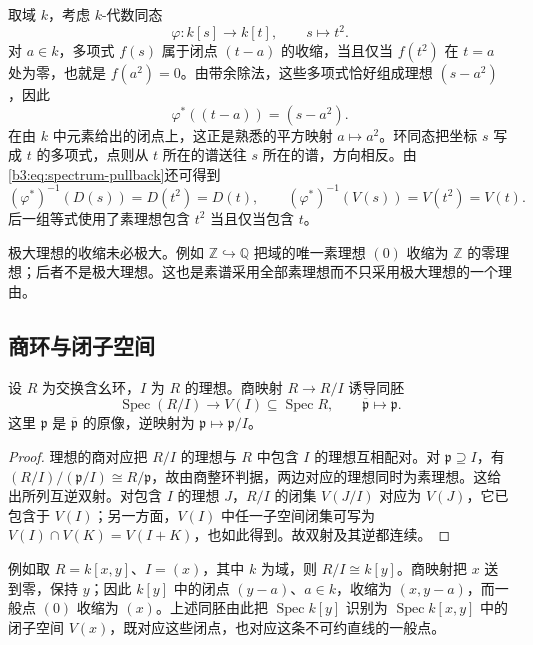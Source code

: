 取域 \(k\)，考虑 \(k\)-代数同态
\[
	\varphi:k[s]\longrightarrow k[t],\qquad s\longmapsto t^2.
\]
对 \(a\in k\)，多项式 \(f(s)\) 属于闭点 \((t-a)\) 的收缩，当且仅当 \(f(t^2)\) 在 \(t=a\) 处为零，也就是 \(f(a^2)=0\)。由带余除法，这些多项式恰好组成理想 \((s-a^2)\)，因此
\[
	\varphi^*((t-a))=(s-a^2).
\]
在由 \(k\) 中元素给出的闭点上，这正是熟悉的平方映射 \(a\mapsto a^2\)。环同态把坐标 \(s\) 写成 \(t\) 的多项式，点则从 \(t\) 所在的谱送往 \(s\) 所在的谱，方向相反。由\eqref{b3:eq:spectrum-pullback}还可得到
\[
	(\varphi^*)^{-1}(D(s))=D(t^2)=D(t),\qquad (\varphi^*)^{-1}(V(s))=V(t^2)=V(t).
\]
后一组等式使用了素理想包含 \(t^2\) 当且仅当包含 \(t\)。

\ProseParagraphBreak
极大理想的收缩未必极大。例如 \(\mathbb Z\hookrightarrow\mathbb Q\) 把域的唯一素理想 \((0)\) 收缩为 \(\mathbb Z\) 的零理想；后者不是极大理想。这也是素谱采用全部素理想而不只采用极大理想的一个理由。

\subsection{商环与闭子空间}
\label{b3:subsec:0104:02}

\begin{theorem}\label{b3:thm:spec-quotient}
	设 \(R\) 为交换含幺环，\(I\) 为 \(R\) 的理想。商映射 \(R\rightarrow R/I\) 诱导同胚
	\[
		\operatorname{Spec}(R/I)\longrightarrow V(I)\subseteq\operatorname{Spec}R, \qquad\overline{\mathfrak p}\longmapsto\mathfrak p.
	\]
	这里 \(\mathfrak p\) 是 \(\overline{\mathfrak p}\) 的原像，逆映射为 \(\mathfrak p\mapsto\mathfrak p/I\)。
\end{theorem}
\begin{proof}
	理想的商对应把 \(R/I\) 的理想与 \(R\) 中包含 \(I\) 的理想互相配对。对 \(\mathfrak p\supseteq I\)，有 \((R/I)/(\mathfrak p/I)\cong R/\mathfrak p\)，故由商整环判据，两边对应的理想同时为素理想。这给出所列互逆双射。对包含 \(I\) 的理想 \(J\)，\(R/I\) 的闭集 \(V(J/I)\) 对应为 \(V(J)\)，它已包含于 \(V(I)\)；另一方面，\(V(I)\) 中任一子空间闭集可写为 \(V(I)\cap V(K)=V(I+K)\)，也如此得到。故双射及其逆都连续。
\end{proof}

例如取 \(R=k[x,y]\)、\(I=(x)\)，其中 \(k\) 为域，则 \(R/I\cong k[y]\)。商映射把 \(x\) 送到零，保持 \(y\)；因此 \(k[y]\) 中的闭点 \((y-a)\)、\(a\in k\)，收缩为 \((x,y-a)\)，而一般点 \((0)\) 收缩为 \((x)\)。上述同胚由此把 \(\operatorname{Spec}k[y]\) 识别为 \(\operatorname{Spec}k[x,y]\) 中的闭子空间 \(V(x)\)，既对应这些闭点，也对应这条不可约直线的一般点。

